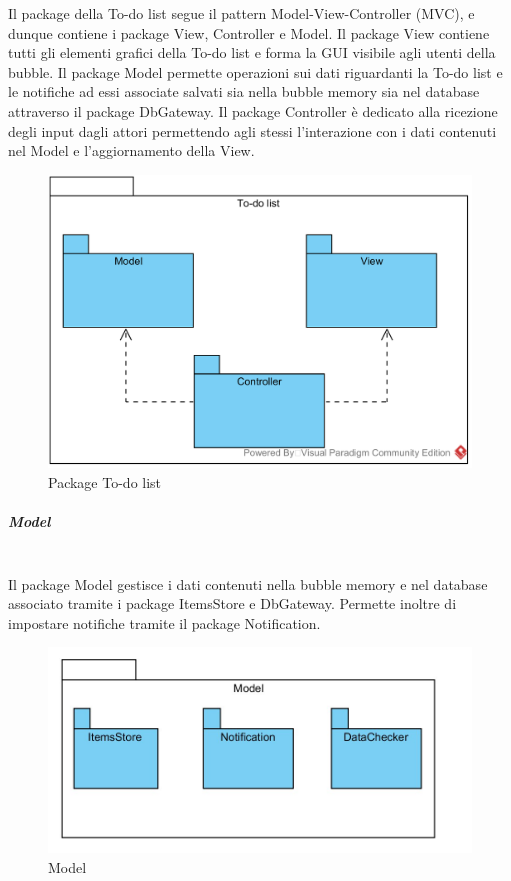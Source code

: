 Il package della To-do list segue il pattern Model-View-Controller (MVC), e dunque contiene i package View, Controller e Model. Il package View contiene tutti gli elementi grafici della To-do list e forma la GUI visibile agli utenti della bubble. Il package Model permette operazioni sui dati riguardanti la To-do list e le notifiche ad essi associate salvati sia nella bubble memory sia nel database attraverso il package Db\-Gateway. Il package Controller è dedicato alla ricezione degli input dagli attori permettendo agli stessi l'interazione con i dati contenuti nel Model e l'aggiornamento della View.

\begin{figure}[H]
	\centering
	\includegraphics[width=14cm]{../../documenti/SpecificaTecnica/diagrammi_img/classi_e_package/todo.png}
	\caption{Package To-do list}
\end{figure}

\subparagraph{Model}\mbox{}\\
Il package Model gestisce i dati contenuti nella bubble memory e nel database associato tramite i package ItemsStore e Db\-Gateway. Permette inoltre di impostare notifiche tramite il package Notification.  
\begin{figure}[H]
	\centering
	\includegraphics[width=14cm]{../../documenti/SpecificaTecnica/diagrammi_img/classi_e_package/todo_model.png}
	\caption{Model}
\end{figure}



